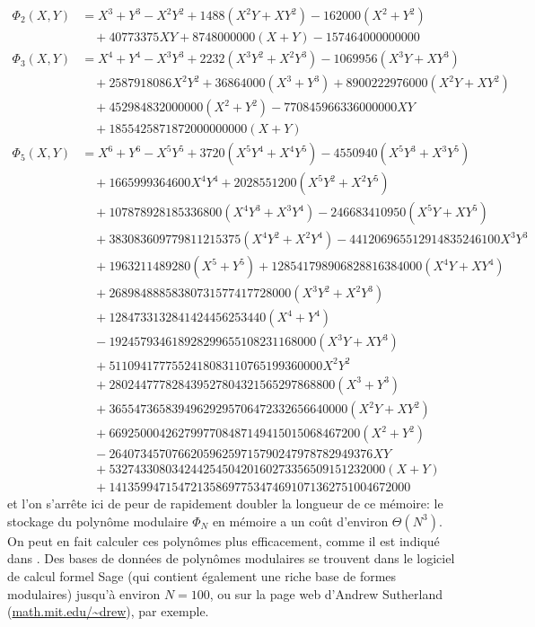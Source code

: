 \documentclass[11pt,a4paper]{article}
\theoremstyle{definition}
\begin{document}
$$\begin{aligned}
\Phi_2(X, Y) &=  X^3 + Y^3 - X^2 Y^2 + 1488(X^2Y + X Y^2)  - 162000(X^2 + Y^2) \\
&\quad + 40773375 XY  + 8748000000(X + Y) - 157464000000000\\
\Phi_3(X, Y) &= X^4 + Y^4 - X^3 Y^3 + 2232(X^3 Y^2 + X^2 Y^3) - 1069956(X^3 Y + X Y^3)\\
&\quad + 2587918086 X^2 Y^2  + 36864000(X^3 + Y^3) + 8900222976000(X^2 Y + X Y^2)  \\
&\quad + 452984832000000(X^2 + Y^2) - 770845966336000000 XY \\
&\quad + 1855425871872000000000(X + Y)\\
\Phi_5(X, Y) &= X^6 + Y^6 -X^5 Y^5 + 3720(X^5 Y^4 + X^4 Y^5) - 4550940(X^5 Y^3 + X^3 Y^5) \\
&\quad + 1665999364600 X^4 Y^4 + 2028551200(X^5 Y^2 + X^2 Y^5) \\
&\quad + 107878928185336800(X^4 Y^3 + X^3 Y^4) - 246683410950(X^5 Y + X Y^5) \\
&\quad + 383083609779811215375(X^4 Y^2 + X^2 Y^4) - 441206965512914835246100 X^3 Y^3 \\
&\quad + 1963211489280(X^5 + Y^5) + 128541798906828816384000(X^4 Y + X Y^4) \\
&\quad + 26898488858380731577417728000(X^3 Y^2 + X^2 Y^3) \\
&\quad +  1284733132841424456253440(X^4 + Y^4) \\
&\quad - 192457934618928299655108231168000(X^3 Y + X Y^3) \\
&\quad + 5110941777552418083110765199360000 X^2 Y^2 \\
&\quad + 280244777828439527804321565297868800(X^3 + Y^3) \\
&\quad + 36554736583949629295706472332656640000(X^2 Y + X Y^2) \\
&\quad + 6692500042627997708487149415015068467200( X^2 + Y^2) \\
&\quad - 264073457076620596259715790247978782949376 XY \\
&\quad + 53274330803424425450420160273356509151232000(X + Y) \\
&\quad + 141359947154721358697753474691071362751004672000
\end{aligned}$$
et l'on s'arrête ici de peur de rapidement doubler la longueur de ce mémoire: le stockage du polynôme modulaire $\Phi_N$ en mémoire a un coût d'environ $\Theta(N^3)$.
On peut en fait calculer ces polynômes plus efficacement, comme il est indiqué dans \cite{Elkies}.
Des bases de données de polynômes modulaires se trouvent dans le logiciel de calcul formel Sage \cite{Sage} (qui contient également une riche base de formes modulaires) jusqu'à environ $N = 100$, ou sur la page web d'Andrew Sutherland (\url{math.mit.edu/~drew}), par exemple.
\end{document}
